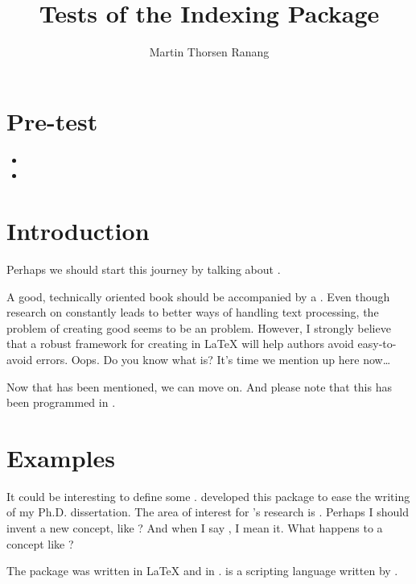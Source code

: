 \documentclass[11pt,norsk,english,american,a4paper]{article}
\title{Tests of the {\InTeX{}} Indexing Package}
\author{Martin Thorsen Ranang}
\begin{document}
\maketitle


\section{Pre-test}

\begin{itemize}
\item {}
\item {}
\end{itemize}

\section{Introduction}
\label{sec:introduction}

Perhaps we should start this journey by talking about .

A good, technically oriented book should be accompanied by a .  Even though research on  constantly leads to
better ways of handling text processing, the problem of creating good
 seems to be an  problem.  However, I strongly
believe that a robust framework for creating  in
\LaTeX\xspace will help authors avoid easy-to-avoid errors.  Oops.  Do
you know what  is?  It's time we mention  up here
now\ldots

Now that  has been mentioned, we can move on.  And please note
that this has been programmed in \co{\LaTeX}.

\section{Examples}
\label{sec:examples}

It could be interesting to define some .   developed
this package to ease the writing of my Ph.D. dissertation.  The area
of interest for 's research is
 .  Perhaps I should
invent a new concept, like
 ?  And when I say
, I mean it.  What happens to a concept like
?

The \InTeX\xspace package was written in \LaTeX\xspace and in
.   is a scripting language written by .
\end{document}
